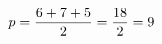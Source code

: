 \documentclass[preview]{standalone}
\begin{document}
\begin{align*}
\special{dvisvgm:raw <g id='unique000'>}p = \frac{6 + 7 + 5}{2} = \frac{18}{2} = 9\special{dvisvgm:raw </g>}
\end{align*}
\end{document}
